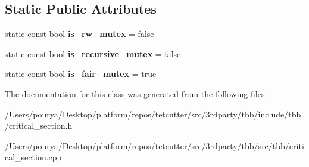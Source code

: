 \subsection*{Static Public Attributes}
\begin{DoxyCompactItemize}
\item 
\hypertarget{classtbb_1_1internal_1_1critical__section__v4_a7a62f98ad578ec8ac01d88de55bd271c}{}static const bool {\bfseries is\+\_\+rw\+\_\+mutex} = false\label{classtbb_1_1internal_1_1critical__section__v4_a7a62f98ad578ec8ac01d88de55bd271c}

\item 
\hypertarget{classtbb_1_1internal_1_1critical__section__v4_a47f75eb62f02cbdee0d602dff38075e9}{}static const bool {\bfseries is\+\_\+recursive\+\_\+mutex} = false\label{classtbb_1_1internal_1_1critical__section__v4_a47f75eb62f02cbdee0d602dff38075e9}

\item 
\hypertarget{classtbb_1_1internal_1_1critical__section__v4_a12f986c4c554db133c2ae657acf2a496}{}static const bool {\bfseries is\+\_\+fair\+\_\+mutex} = true\label{classtbb_1_1internal_1_1critical__section__v4_a12f986c4c554db133c2ae657acf2a496}

\end{DoxyCompactItemize}


The documentation for this class was generated from the following files\+:\begin{DoxyCompactItemize}
\item 
/\+Users/pourya/\+Desktop/platform/repos/tetcutter/src/3rdparty/tbb/include/tbb/critical\+\_\+section.\+h\item 
/\+Users/pourya/\+Desktop/platform/repos/tetcutter/src/3rdparty/tbb/src/tbb/critical\+\_\+section.\+cpp\end{DoxyCompactItemize}
